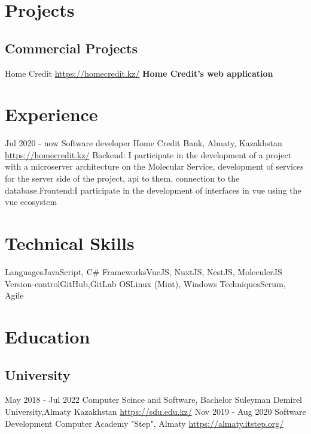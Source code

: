 \documentclass[11pt,a4paper]{moderncv}
\begin{document}
\maketitle

\section{Projects}
  \subsection{Commercial Projects}
  \cvline
    {Home Credit}
    {\url{https://homecredit.kz/}\newline{}
    \textbf{Home Credit's web application}\newline{}
    }
\section{Experience}
\cventry
  {Jul 2020 - now}
  {Software developer}
  {Home Credit Bank, Almaty, Kazakhstan}
  {\newline{}\url{https://homecredit.kz/}}{}
  {Backend: I participate in the development of a project with a microserver architecture on the Molecular  Service,  development of services for the server side of the project, api to them, connection to the    database.\newline Frontend:I participate in the development of interfaces in vue using the vue ecosystem}
\section{Technical Skills}
\cvline
  {Languages}{JavaScript, C\#}
\cvline
  {Frameworks}{VueJS, NuxtJS, NestJS, MoleculerJS}
\cvline
  {Version-control}{GitHub,GitLab}
\cvline
  {OS}{Linux (Mint), Windows}
\cvline
  {Techniques}{Scrum, Agile}

\section{Education}
  \subsection{University}
  \cventry
    {May 2018 - Jul 2022}
    {Computer Scince and Software, Bachelor}
    {Suleyman Demirel University,Almaty Kazakhstan}
    {}{\newline\url{https://sdu.edu.kz/}}{}
  \cventry
    {Nov 2019 - Aug 2020}
    {Software Development}
    {Computer Academy "Step", Almaty}
    {}{\newline\url{https://almaty.itstep.org/}}{}
\end{document}
